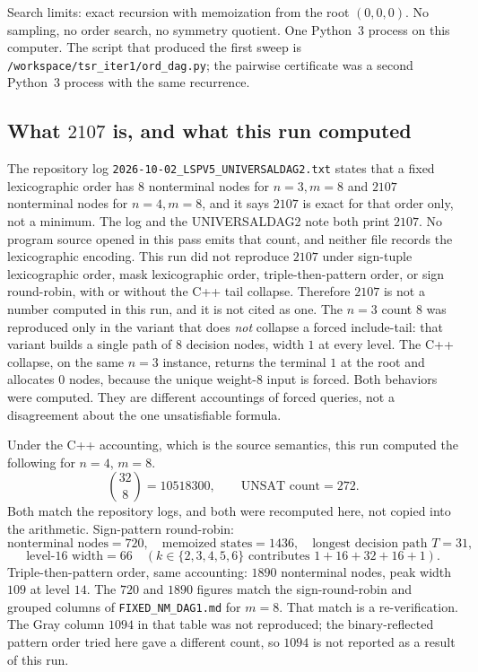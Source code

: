 \documentclass[11pt]{article}
\begin{document}
Search limits: exact recursion with memoization from the root \((0,0,0)\).
No sampling, no order search, no symmetry quotient.
One Python~3 process on this computer.
The script that produced the first sweep is \texttt{/workspace/tsr\_iter1/ord\_dag.py}; the pairwise certificate was a second Python~3 process with the same recurrence.

\subsection*{What \(2107\) is, and what this run computed}
The repository log \texttt{2026-10-02\_LSPV5\_UNIVERSALDAG2.txt} states that a fixed lexicographic order has \(8\) nonterminal nodes for \(n=3,m=8\) and \(2107\) nonterminal nodes for \(n=4,m=8\), and it says \(2107\) is exact for that order only, not a minimum.
The log and the UNIVERSALDAG2 note both print \(2107\). No program source opened in this pass emits that count, and neither file records the lexicographic encoding.
This run did not reproduce \(2107\) under sign-tuple lexicographic order, mask lexicographic order, triple-then-pattern order, or sign round-robin, with or without the C++ tail collapse.
Therefore \(2107\) is not a number computed in this run, and it is not cited as one.
The \(n=3\) count \(8\) was reproduced only in the variant that does \emph{not} collapse a forced include-tail: that variant builds a single path of \(8\) decision nodes, width \(1\) at every level.
The C++ collapse, on the same \(n=3\) instance, returns the terminal \(1\) at the root and allocates \(0\) nodes, because the unique weight-\(8\) input is forced.
Both behaviors were computed.
They are different accountings of forced queries, not a disagreement about the one unsatisfiable formula.

Under the C++ accounting, which is the source semantics, this run computed the following for \(n=4\), \(m=8\).
\[
\binom{32}{8}=10518300,\qquad \text{UNSAT count}=272.
\]
Both match the repository logs, and both were recomputed here, not copied into the arithmetic.
Sign-pattern round-robin:
\[
\text{nonterminal nodes}=720,\quad
\text{memoized states}=1436,\quad
\text{longest decision path }T=31,
\]
\[
\text{level-}16\text{ width}=66
\quad(k\in\{2,3,4,5,6\}\text{ contributes }1+16+32+16+1).
\]
Triple-then-pattern order, same accounting: \(1890\) nonterminal nodes, peak width \(109\) at level \(14\).
The \(720\) and \(1890\) figures match the sign-round-robin and grouped columns of \texttt{FIXED\_NM\_DAG1.md} for \(m=8\).
That match is a re-verification.
The Gray column \(1094\) in that table was not reproduced; the binary-reflected pattern order tried here gave a different count, so \(1094\) is not reported as a result of this run.
\end{document}
